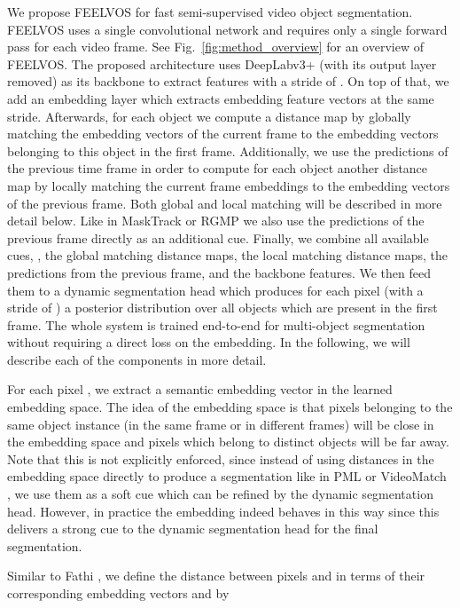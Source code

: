 \documentclass[10pt,twocolumn,letterpaper]{article}
\newcommand{\PAR}[1]{\vskip1pt \noindent {\bf #1~}}
\newcommand{\PARbegin}[1]{\noindent {\bf #1~}}
\begin{document}
\PARbegin{Overview.} We propose FEELVOS for fast semi-supervised video object segmentation. FEELVOS uses a single convolutional network and requires only a single forward pass for each video frame. See Fig.~\ref{fig:method_overview} for an overview of FEELVOS.
The proposed architecture uses DeepLabv3+ \cite{Chen18ECCV} (with its output layer removed) as its backbone to extract features with a stride of . On top of that, we add an embedding layer which extracts embedding feature vectors at the same stride.
Afterwards, for each object we compute a distance map by globally matching the embedding vectors of the current frame to the embedding vectors belonging to this object in the first frame.
Additionally, we use the predictions of the previous time frame in order to compute for each object another distance map by locally matching the current frame embeddings to the embedding vectors of the previous frame. Both global and local matching will be described in more detail below.
Like in MaskTrack \cite{masktrack} or RGMP \cite{Oh18CVPR} we also use the predictions of the previous frame directly as an additional cue.
Finally, we combine all available cues, \ie, the global matching distance maps, the local matching distance maps, the predictions from the previous frame, and the backbone features. We then feed them to a dynamic segmentation head which produces for each pixel (with a stride of ) a posterior distribution over all objects which are present in the first frame. The whole system is trained end-to-end for multi-object segmentation without requiring a direct loss on the embedding. In the following, we will describe each of the components in more detail.

\PAR{Semantic Embedding.}
For each pixel , we extract a semantic embedding vector  in the learned embedding space. The idea of the embedding space is that pixels belonging to the same object instance (in the same frame or in different frames) will be close in the embedding space and pixels which belong to distinct objects will be far away. Note that this is not explicitly enforced, since instead of using distances in the embedding space directly to produce a segmentation like in PML \cite{Chen18CVPR} or VideoMatch \cite{Hu18ECCV}, we use them as a soft cue which can be refined by the dynamic segmentation head.
However, in practice the embedding indeed behaves in this way since this delivers a strong cue to the dynamic segmentation head for the final segmentation.

Similar to Fathi \etal \cite{Fathi17Arxiv}, we define the distance between pixels  and  in terms of their corresponding embedding vectors  and  by
\end{document}
